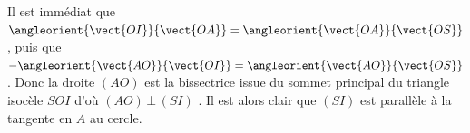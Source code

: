 Il est immédiat que
$\angleorient{\vect{OI}}{\vect{OA}}
= \angleorient{\vect{OA}}{\vect{OS}}$ ,
puis que
$- \angleorient{\vect{AO}}{\vect{OI}}
= \angleorient{\vect{AO}}{\vect{OS}}$ .
Donc la droite $(AO)$ est la bissectrice issue du sommet principal du triangle isocèle $SOI$ d'où $(AO) \,\bot\, (SI)$ . Il est alors clair que $(SI)$ est parallèle à la tangente en $A$ au cercle.
